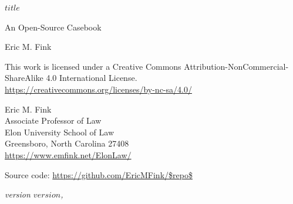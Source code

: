 \begin{flushright}

\vspace*{50mm}

{\bfseries\Huge{$title$}} 

{\bfseries\vspace{5mm}}

{\Large{An Open-Source Casebook}} 

\vspace{20mm}

{\normalsize{Eric M. Fink}} 

\vspace*{\fill}

\begin{small}



\rmfamily{\monthyear} 

\end{small}

\end{flushright}

\clearpage


\thispagestyle{empty}
\begingroup
\parindent 0pt
\vspace*{\fill}

\ccbyncsa

\begin{small}
\raggedright{This work is licensed under a Creative Commons Attribution-NonCommercial-ShareAlike 4.0 International License.} \\
\url{https://creativecommons.org/licenses/by-nc-sa/4.0/}

\vspace{1em}

Eric M. Fink\\
Associate Professor of Law \\
Elon University School of Law \\
Greensboro, North Carolina 27408 \\
\url{https://www.emfink.net/ElonLaw/}

\vspace{1em}

Source code: \url{https://github.com/EricMFink/$repo$}

\itshape{version $version$, \monthyear}

\end{small}
\endgroup

